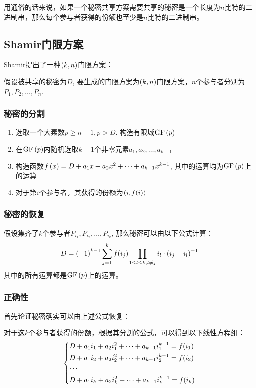 用通俗的话来说，如果一个秘密共享方案需要共享的秘密是一个长度为$n$比特的二进制串，那么每个参与者获得的份额也至少是$n$比特的二进制串。
\subsection{Shamir门限方案}
Shamir提出了一种$\left( {k, n}\right)$门限方案：\par
假设被共享的秘密为$D$, 要生成的门限方案为$\left( {k, n}\right)$门限方案，$n$个参与者分别为$P_1, P_2,\ldots, P_n$.
\subsubsection{秘密的分割}
\begin{enumerate}
	\item 选取一个大素数$p\geq n+1, p>D$. 构造有限域$\mathrm{GF}\left( {p}\right)$
	\item 在$\mathrm{GF}\left( {p}\right)$内随机选取$k-1$个非零元素$a_1, a_2,\ldots, a_{k-1}$
	\item 构造函数$f\left( {x}\right)=D+a_1x+a_2x^2+\cdots +a_{k-1}x^{k-1}$, 其中的运算均为$\mathrm{GF}\left( {p}\right)$上的运算
	\item 对于第$i$个参与者，其获得的份额为$\left( {i, f(i)}\right)$
\end{enumerate}
\subsubsection{秘密的恢复}
假设集齐了$k$个参与者$P_{i_1}, P_{i_2}, \ldots, P_{i_k}$, 那么秘密可以由以下公式计算：
\begin{equation}
D=\left( {-1}\right)^{k-1}\sum_{j=1}^kf(i_j)\prod_{1\leq l\leq k, l\neq j}i_l\cdot\left( {i_j-i_l}\right)^{-1}
\end{equation}
其中的所有运算都是$\mathrm{GF}\left( {p}\right)$上的运算。
\subsubsection{正确性}
首先论证秘密确实可以由上述公式恢复：\par
对于这$k$个参与者获得的份额，根据其分割的公式，可以得到以下线性方程组：
\begin{equation}
\begin{dcases}
D+a_1i_1+a_2i_1^2+\cdots +a_{k-1}i_1^{k-1}=f(i_1)\\
D+a_1i_2+a_2i_2^2+\cdots +a_{k-1}i_2^{k-1}=f(i_2)\\
\cdots\\
D+a_1i_k+a_2i_k^2+\cdots +a_{k-1}i_k^{k-1}=f(i_k)
\end{dcases}
\end{equation}

